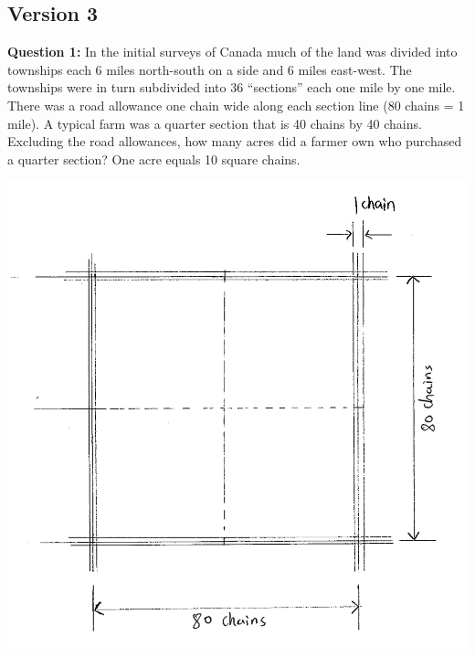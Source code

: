 \documentclass{article}
\begin{document}
\newpage
\subsection*{Version 3}
\textbf{Question 1:} In the initial surveys of Canada much of the land was divided into townships each 6 miles north-south on a side and 6 miles east-west. The townships were in turn subdivided into 36 ``sections'' each one mile by one mile. There was a road allowance one chain wide along each section line (80 chains = 1 mile). A typical farm was a quarter section that is 40 chains by 40 chains. Excluding the road allowances, how many acres did a farmer own who purchased a quarter section? One acre equals 10 square chains.
\begin{center}
    \includegraphics[width=0.8\linewidth]{2009-3-1.png}
\end{center}
\end{document}
